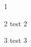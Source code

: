 \documentclass{beamer}
\begin{document}
\begin{frame} %
	1
\end{frame} %

\newcommand{\test}[1]{test #1}

\begin{frame} %
	2 \test{2}
\end{frame} %

\begin{frame} %
	3 \test{3}
\end{frame} %
\end{document}
